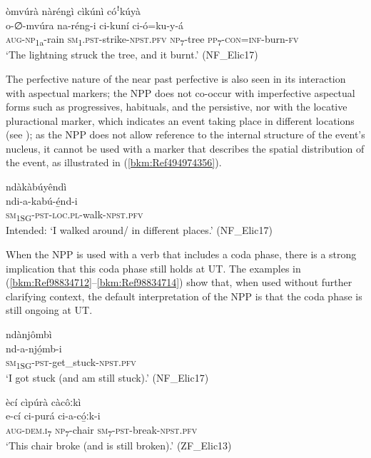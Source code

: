\newpage
\ea
\label{bkm:Ref494881934}
òmvúrà nàréngì cìkúnì cóꜝkúyà\\
\gll o-∅-mvúra    na-réng-i      ci-kuní ci-ó=ku-y-á \\
\textsc{aug}-\textsc{np}\textsubscript{1a}-rain  \textsc{sm}\textsubscript{1}.\textsc{pst}-strike-\textsc{npst}.\textsc{pfv}  \textsc{np}\textsubscript{7}-tree
\textsc{pp}\textsubscript{7}-\textsc{con}=\textsc{inf}-burn-\textsc{fv}\\
\glt ‘The lightning struck the tree, and it burnt.’ (NF\_Elic17)
\z

The perfective nature of the near past perfective is also seen in its interaction with aspectual markers; the NPP does not co-occur with imperfective aspectual forms such as progressives, habituals, and the persistive, nor with the locative pluractional marker, which indicates an event taking place in different locations (see ); as the NPP does not allow reference to the internal structure of the event’s nucleus, it cannot be used with a marker that describes the spatial distribution of the event, as illustrated in (\ref{bkm:Ref494974356}).

\ea
\label{bkm:Ref494974356}
\glll *ndàkàbúyêndì\\
ndi-a-kabú-é̲nd-i\\
\textsc{sm}\textsubscript{1SG}-\textsc{pst}-\textsc{loc}.\textsc{pl}-walk-\textsc{npst}.\textsc{pfv}\\
\glt Intended: ‘I walked around/ in different places.’ (NF\_Elic17)
\z

When the NPP is used with a verb that includes a coda phase, there is a strong implication that this coda phase still holds at UT. The examples in (\ref{bkm:Ref98834712}--\ref{bkm:Ref98834714}) show that, when used without further clarifying context, the default interpretation of the NPP is that the coda phase is still ongoing at UT.

\ea
\label{bkm:Ref98834712}
\glll ndànjômbì\\
nd-a-njó̲mb-i\\
\textsc{sm}\textsubscript{1SG}-\textsc{pst}-get\_stuck-\textsc{npst}.\textsc{pfv}\\
\glt ‘I got stuck (and am still stuck).’ (NF\_Elic17)
\z

\ea
ècí cìpúrà càcôːkì\\
\gll e-cí    ci-purá  ci-a-có̲ːk-i\\
\textsc{aug}-\textsc{dem}.\textsc{i}\textsubscript{7}  \textsc{np}\textsubscript{7}-chair  \textsc{sm}\textsubscript{7}-\textsc{pst}-break-\textsc{npst}.\textsc{pfv}\\
\glt ‘This chair broke (and is still broken).’ (ZF\_Elic13)
\z

